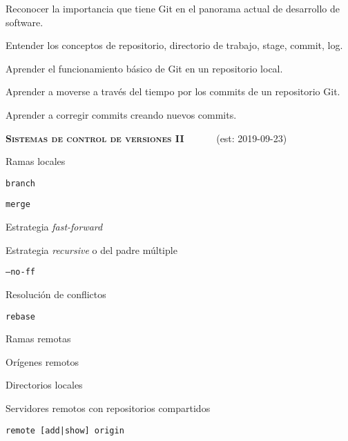\begin{longenum}
\begin{longenum}
\begin{longenum}
\begin{longenum}
                \item Reconocer la importancia que tiene Git en el panorama actual de desarrollo de software.
                \item Entender los conceptos de repositorio, directorio de trabajo, stage, commit, log.
                \item Aprender el funcionamiento básico de Git en un repositorio local.
                \item Aprender a moverse a través del tiempo por los commits de un repositorio Git.
                \item Aprender a corregir commits creando nuevos commits.
            \end{longenum}
        \end{longenum}
    \end{longenum}
    \item \textbf{\textsc{Sistemas de control de versiones II}} \ \ \ \ \ \ (est: \mbox{2019-09-23})
    \begin{longenum}
        \item Ramas locales
        \begin{longenum}
            \item \texttt{branch}
            \item \texttt{merge}
            \begin{longenum}
                \item Estrategia \textit{fast-forward}
                \item Estrategia \textit{recursive} o del padre múltiple
                \item \texttt{--no-ff}
            \end{longenum}
            \item Resolución de conflictos
            \item \texttt{rebase}
        \end{longenum}
        \item Ramas remotas
        \begin{longenum}
            \item Orígenes remotos
            \begin{longenum}
                \item Directorios locales
                \item Servidores remotos con repositorios compartidos
                \item \texttt{remote [add|show] origin}
            \end{longenum}

\end{longenum}
\end{longenum}
\end{longenum}
